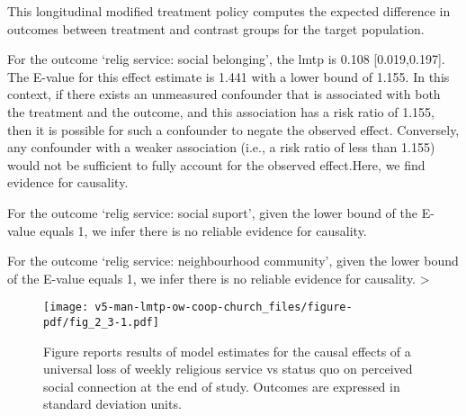 \documentclass[
  singlecolumn]{article}
\begin{document}
This longitudinal modified treatment policy computes the expected
difference in outcomes between treatment and contrast groups for the
target population.

For the outcome `relig service: social belonging', the lmtp is 0.108
{[}0.019,0.197{]}. The E-value for this effect estimate is 1.441 with a
lower bound of 1.155. In this context, if there exists an unmeasured
confounder that is associated with both the treatment and the outcome,
and this association has a risk ratio of 1.155, then it is possible for
such a confounder to negate the observed effect. Conversely, any
confounder with a weaker association (i.e., a risk ratio of less than
1.155) would not be sufficient to fully account for the observed
effect.Here, we find evidence for causality.

For the outcome `relig service: social suport', given the lower bound of
the E-value equals 1, we infer there is no reliable evidence for
causality.

For the outcome `relig service: neighbourhood community', given the
lower bound of the E-value equals 1, we infer there is no reliable
evidence for causality. \textgreater{}

\newpage{}

\begin{figure}[H]

{\centering \texttt{[image: v5-man-lmtp-ow-coop-church\_files/figure-pdf/fig\_2\_3-1.pdf]}

}

\caption{Figure reports results of model estimates for the causal
effects of a universal loss of weekly religious service vs status quo on
perceived social connection at the end of study. Outcomes are expressed
in standard deviation units.}

\end{figure}%
\end{document}
